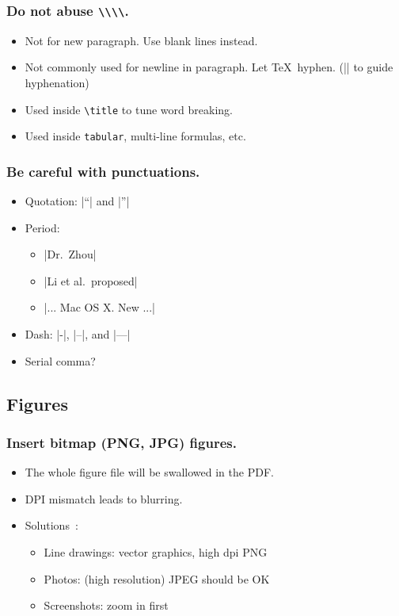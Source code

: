 \documentclass[CJKchecksingle]{beamer}
\newcommand{\env}[1]{\lstinline|#1|}
\begin{document}
\begin{frame}[fragile]\frametitle{Do not abuse \lstinline|\\\\|.}

\begin{itemize}
\item
  Not for new paragraph. Use blank lines instead.
\item
  Not commonly used for newline in paragraph. Let \TeX\ hyphen.
  (|\-| to guide hyphenation)
\pause
\item
  Used inside \lstinline{\title} to tune word breaking.
\item
  Used inside \env{tabular}, multi-line formulas, etc.
\end{itemize}

\end{frame}

\begin{frame}[fragile]\frametitle{Be careful with punctuations.}
  \begin{itemize}
    \item Quotation: |``| and |''|
    \item Period:
      \begin{itemize}
        \item |Dr.~Zhou|
        \item |Li et al.\ proposed|
        \item |... Mac OS X\@. New ...|
      \end{itemize}
    \item Dash: |-|, |--|, and |---|
    \item Serial comma?
  \end{itemize}
\end{frame}

\subsection{Figures}

\begin{frame}\frametitle{Insert bitmap (PNG, JPG) figures.}

\begin{itemize}
\item
  The whole figure file will be swallowed in the PDF.
\item
  DPI mismatch leads to blurring.
\pause
\item
  Solutions~\cite{hoeppner,blurry,blurry2}:
  \begin{itemize}
    \item
      Line drawings: \alert{vector graphics}, high dpi PNG
    \item
      Photos: (high resolution) JPEG should be OK
    \item
      Screenshots: zoom in first
  \end{itemize}
\end{itemize}

\end{frame}
\end{document}
